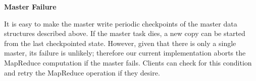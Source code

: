 \vspace*{8pt}%
\textbf{Master Failure}%
\vspace*{8pt}%

It is easy to make the master write periodic checkpoints
of the master data structures described above. If the master
task dies, a new copy can be started from the last
checkpointed state. However, given that there is only a
single master, its failure is unlikely; therefore our current
implementation aborts the MapReduce computation
if the master fails. Clients can check for this condition
and retry the MapReduce operation if they desire.